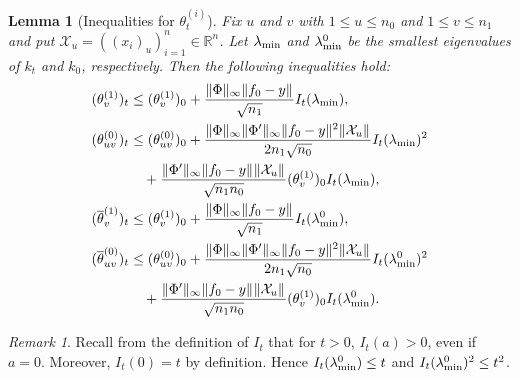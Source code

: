 \documentclass{article}
\newtheorem{lem}[thm]{Lemma}
\theoremstyle{definition}
\theoremstyle{remark}
\newtheorem{rem}[thm]{Remark}
\numberwithin{equation}{section}
\newcommand{\X}{\mathcal{X}}
\newcommand{\R}{\mathbb{R}}
\newcommand{\lammin}{\lambda_{\textup{min}}}
\newcommand{\norm}[2]{
    \|#1\|_{#2}
}
\begin{document}
    \begin{lem}[Inequalities for $\theta^{(i)}_t$]
        \label{lem:gronwallbeta}
        Fix $u$ and $v$ with $1 \le u \le n_0$ and $1 \le v \le n_1$ and put $\X_u = ((x_i)_u)_{i=1}^n\in \R^n$.
        Let $\lammin$ and $\lammin^0$ be the smallest eigenvalues of $k_t$ and $k_0$, respectively.
        Then the following inequalities hold:
        \begin{align}
            (\theta^{(1)}_v)_t &\le (\theta_v^{(1)})_0 + \frac{\norm{\Phi}{\infty}\norm{f_0-y}{}}{\sqrt{n_1}}I_t(\lammin),\\
            (\theta^{(0)}_{uv})_t &\le (\theta_{uv}^{(0)})_0 + \frac{\norm{\Phi}{\infty}\norm{\Phi'}{\infty}\norm{f_0-y}{}^2\norm{\X_u}{}}{2n_1\sqrt{n_0}}I_t(\lammin)^2\\
        &\quad + \frac{\norm{\Phi'}{\infty}\norm{f_0-y}{}\norm{\X_u}{}}{\sqrt{n_1n_0}}(\theta^{(1)}_v)_0{}I_t(\lammin),\\
        (\overline \theta^{(1)}_v)_t &\le (\theta_v^{(1)})_0 + \frac{\norm{\Phi}{\infty}\norm{f_0-y}{}}{\sqrt{n_1}}I_t(\lammin^0),\\
        (\overline \theta^{(0)}_{uv})_t &\le (\theta_{uv}^{(0)})_0 + \frac{\norm{\Phi}{\infty}\norm{\Phi'}{\infty}\norm{f_0-y}{}^2\norm{\X_u}{}}{2n_1\sqrt{n_0}}I_t(\lammin^0)^2 \\
    &\quad + \frac{\norm{\Phi'}{\infty}\norm{f_0-y}{}\norm{\X_u}{}}{\sqrt{n_1n_0}}(\theta^{(1)}_v)_0{}I_t(\lammin^0).
\end{align}
    \end{lem} 
    \begin{rem}
        Recall from the definition of $I_t$ that for $t>0$, $I_t(a) > 0$, even if $a = 0$.
        Moreover, $I_t(0) = t$ by definition.
        Hence $I_t(\lammin^0) \le t$ and $I_t(\lammin^0)^2 \le t^2$.

    \end{rem}
\end{document}
